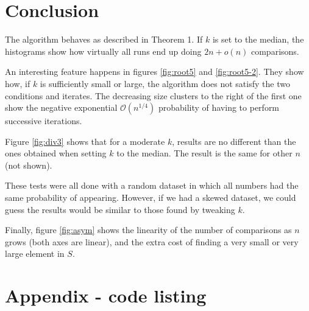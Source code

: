 \documentclass[12pt,a4paper]{article}
\begin{document}
\clearpage

\section{Conclusion}

The algorithm behaves as described in Theorem 1. If $k$ is set to the
median, the histograms show how virtually all runs end up doing
$2n + o(n)$ comparisons.

An interesting feature happens in figures \ref{fig:root5} and
\ref{fig:root5-2}. They show how, if $k$ is sufficiently small or
large, the algorithm does not satisfy the two conditions and
iterates. The decreasing size clusters to the right of the first one
show the negative exponential $\mathcal{O}(n^{1/4})$ probability of
having to perform successive iterations.

Figure \ref{fig:div3} shows that for a moderate $k$, results are no
different than the ones obtained when setting $k$ to the median. The
result is the same for other $n$ (not shown).

These tests were all done with a random dataset in which all numbers
had the same probability of appearing. However, if we had a skewed
dataset, we could guess the results would be similar to those found by
tweaking $k$.

Finally, figure \ref{fig:asym} shows the linearity of the number of
comparisons as $n$ grows (both axes are linear), and the extra cost of
finding a very small or very large element in $S$.

\nocite{*}




\appendix
\section{Appendix - code listing}

\inputminted[label=core.clj]{clojure}{../src/lazy_selection/core.clj}
\end{document}
